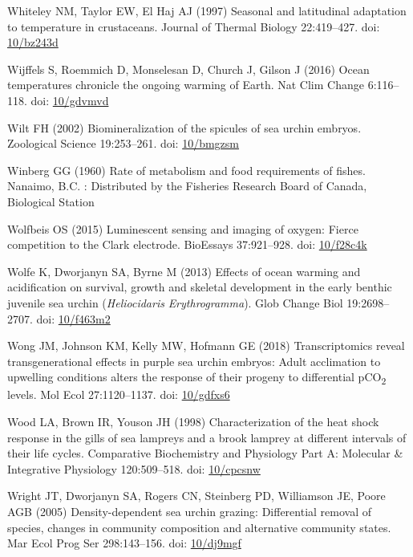 \documentclass[a4paper,10pt, oneside]{memoir}
\begin{document}
\leavevmode\hypertarget{ref-Whiteley1997}{}%
Whiteley NM, Taylor EW, El Haj AJ (1997) Seasonal and latitudinal adaptation to temperature in crustaceans. Journal of Thermal Biology 22:419--427. doi: \href{https://doi.org/10/bz243d}{10/bz243d}

\leavevmode\hypertarget{ref-Wijffels2016}{}%
Wijffels S, Roemmich D, Monselesan D, Church J, Gilson J (2016) Ocean temperatures chronicle the ongoing warming of Earth. Nat Clim Change 6:116--118. doi: \href{https://doi.org/10/gdvmvd}{10/gdvmvd}

\leavevmode\hypertarget{ref-Wilt2002}{}%
Wilt FH (2002) Biomineralization of the spicules of sea urchin embryos. Zoological Science 19:253--261. doi: \href{https://doi.org/10/bmgzsm}{10/bmgzsm}

\leavevmode\hypertarget{ref-Winberg1960}{}%
Winberg GG (1960) Rate of metabolism and food requirements of fishes. Nanaimo, B.C. : Distributed by the Fisheries Research Board of Canada, Biological Station

\leavevmode\hypertarget{ref-Wolfbeis2015}{}%
Wolfbeis OS (2015) Luminescent sensing and imaging of oxygen: Fierce competition to the Clark electrode. BioEssays 37:921--928. doi: \href{https://doi.org/10/f28c4k}{10/f28c4k}

\leavevmode\hypertarget{ref-Wolfe2013}{}%
Wolfe K, Dworjanyn SA, Byrne M (2013) Effects of ocean warming and acidification on survival, growth and skeletal development in the early benthic juvenile sea urchin (\emph{Heliocidaris} \emph{Erythrogramma}). Glob Change Biol 19:2698--2707. doi: \href{https://doi.org/10/f463m2}{10/f463m2}

\leavevmode\hypertarget{ref-Wong2018}{}%
Wong JM, Johnson KM, Kelly MW, Hofmann GE (2018) Transcriptomics reveal transgenerational effects in purple sea urchin embryos: Adult acclimation to upwelling conditions alters the response of their progeny to differential pCO\textsubscript{2} levels. Mol Ecol 27:1120--1137. doi: \href{https://doi.org/10/gdfxs6}{10/gdfxs6}

\leavevmode\hypertarget{ref-Wood1998}{}%
Wood LA, Brown IR, Youson JH (1998) Characterization of the heat shock response in the gills of sea lampreys and a brook lamprey at different intervals of their life cycles. Comparative Biochemistry and Physiology Part A: Molecular \& Integrative Physiology 120:509--518. doi: \href{https://doi.org/10/cpcsnw}{10/cpcsnw}

\leavevmode\hypertarget{ref-Wright2005}{}%
Wright JT, Dworjanyn SA, Rogers CN, Steinberg PD, Williamson JE, Poore AGB (2005) Density-dependent sea urchin grazing: Differential removal of species, changes in community composition and alternative community states. Mar Ecol Prog Ser 298:143--156. doi: \href{https://doi.org/10/dj9mgf}{10/dj9mgf}
\end{document}

